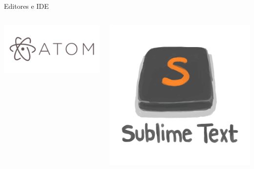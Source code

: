 \documentclass[bigger,unknownkeysallowed]{beamer}
\begin{document}
\begin{frame}[label={sec:orgb5d527d}]{Editores e IDE}
\begin{columns}
\begin{column}{0.32\columnwidth}
\begin{center}
\includegraphics[width=\textwidth]{atom_logo.png}
\end{center}
\end{column}

\begin{column}{0.2\columnwidth}
\begin{center}
\includegraphics[width=\textwidth]{sublimetext.png}
\end{center}
\end{column}


\end{columns}
\end{frame}
\end{document}
